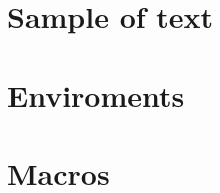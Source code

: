 \documentclass[14pt,executivepaper]{extbook} %
\def \SourceRootPath{.}
\begin{document}
\listoftables




\mainmatter 

\cleardoublepage %
\pagestyle{fancy} %


\part{Sample of text}



\part{Enviroments}




\part{Macros}





\backmatter
\end{document}
